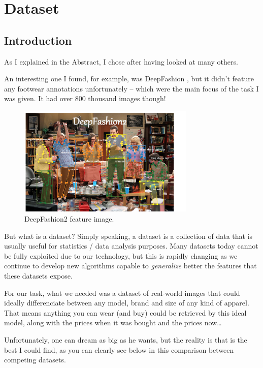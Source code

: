 \chapter{Dataset}\label{s:ds}

\section{Introduction}\label{s:ds-intro}

As I explained in the Abstract, I chose \modanet after having looked at many others.

An interesting one I found, for example, was DeepFashion \cite{DeepFashion2}, but it didn't feature any footwear annotations unfortunately -- which were the main focus of the task I was given. It had over 800 thousand images though!

\begin{figure}[H]
	\centering
	\includegraphics[width=0.75\textwidth]{images/deepfashion2_bigbang}
	\caption{DeepFashion2 feature image.}
	\label{f:deepfashion2_bigbang}
\end{figure}

But what is a dataset? Simply speaking, a dataset is a collection of data that is usually useful for statistics / data analysis purposes. Many datasets today cannot be fully exploited due to our technology, but this is rapidly changing as we continue to develop new algorithms capable to \emph{generalize} better the features that these datasets expose.

For our task, what we needed was a dataset of real-world images that could ideally differenciate between any model, brand and size of any kind of apparel. That means anything you can wear (and buy) could be retrieved by this ideal model, along with the prices when it was bought and the prices now\dots

Unfortunately, one can dream as big as he wants, but the reality is that \modanet is the best I could find, as you can clearly see below in this comparison between competing datasets.

